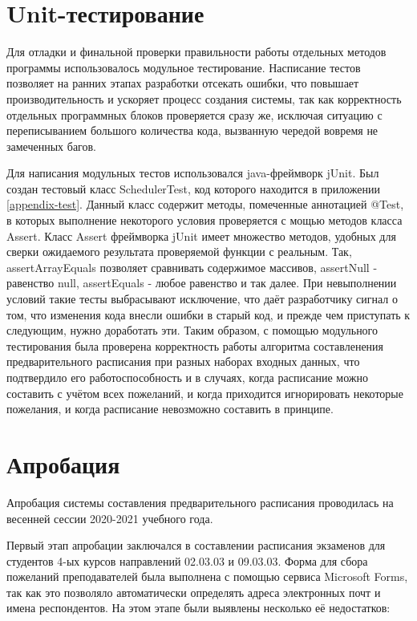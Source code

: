 \section{Unit-тестирование} \label{ch4:sec2}

Для отладки и финальной проверки правильности работы отдельных методов программы использовалось модульное тестирование. Насписание тестов позволяет на ранних этапах разработки отсекать ошибки, что повышает производительность и ускоряет процесс создания системы, так как корректность отдельных программных блоков проверяется сразу же, исключая ситуацию с переписыванием большого количества кода, вызванную чередой вовремя не замеченных багов.

Для написания модульных тестов использовался java-фреймворк jUnit. Был создан тестовый класс SchedulerTest, код которого находится в приложении \ref{appendix-test}. Данный класс содержит методы, помеченные аннотацией @Test, в которых выполнение некоторого условия проверяется с мощью методов класса Assert. Класс Assert фреймворка jUnit имеет множество методов, удобных для сверки ожидаемого результата проверяемой функции с реальным. Так, assertArrayEquals позволяет сравнивать содержимое массивов, assertNull - равенство null, assertEquals - любое равенство и так далее. При невыполнении условий такие тесты выбрасывают исключение, что даёт разработчику сигнал о том, что изменения кода внесли ошибки в старый код, и прежде чем приступать к следующим, нужно доработать эти. Таким образом, с помощью модульного тестирования была проверена корректность работы алгоритма составленения предварительного расписания при разных наборах входных данных, что подтвердило его работоспособность и в случаях, когда расписание можно составить с учётом всех пожеланий, и когда приходится игнорировать некоторые пожелания, и когда расписание невозможно составить в принципе. 

\section{Апробация} \label{ch4:sec3}
Апробация системы составления предварительного расписания проводилась на весенней сессии 2020-2021 учебного года. 

Первый этап апробации заключался в составлении расписания экзаменов для студентов 4-ых курсов направлений 02.03.03 и 09.03.03. Форма для сбора пожеланий преподавателей была выполнена с помощью сервиса Microsoft Forms, так как это позволяло автоматически определять адреса электронных почт и имена респондентов. На этом этапе были выявлены несколько её недостатков:

